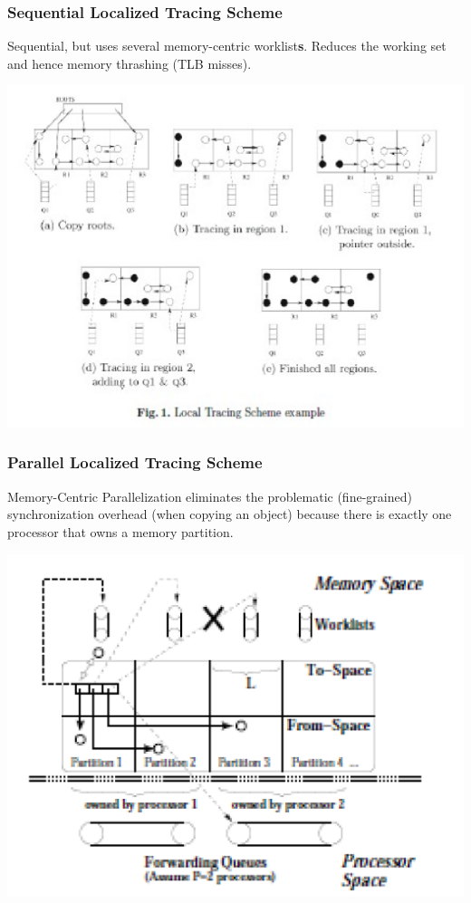 \documentclass{beamer}
\begin{document}
\begin{frame}[fragile,t]
  \frametitle{Sequential Localized Tracing Scheme}

Sequential, but uses several memory-centric worklist{\bf{}s}.
Reduces the working set and hence memory thrashing (TLB misses). 

\center\includegraphics[width=59ex]{Figures/LocalTracing}

\end{frame}


\begin{frame}[fragile,t]
  \frametitle{Parallel Localized Tracing Scheme}

Memory-Centric Parallelization eliminates the problematic
(fine-grained) synchronization overhead (when copying an object)
because there is exactly one processor that owns a memory
partition.   

\center\includegraphics[width=47ex]{Figures/ParTracing}

\end{frame}
\end{document}
